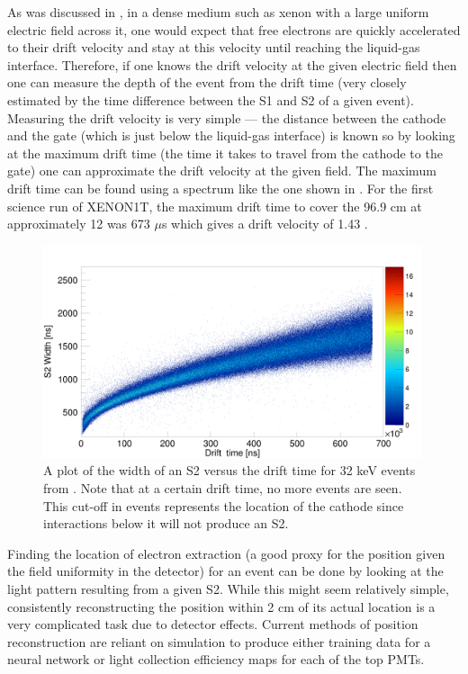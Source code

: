 As was discussed in , in a dense medium such as xenon with a large uniform electric field across it, one would expect that free electrons are quickly accelerated to their drift velocity and stay at this velocity until reaching the liquid-gas interface.  Therefore, if one knows the drift velocity at the given electric field then one can measure the depth of the event from the drift time (very closely estimated by the time difference between the S1 and S2 of a given event).  Measuring the drift velocity is very simple --- the distance between the cathode and the gate (which is just below the liquid-gas interface) is known so by looking at the maximum drift time (the time it takes to travel from the cathode to the gate) one can approximate the drift velocity at the given field.  The maximum drift time can be found using a spectrum like the one shown in .  For the first science run of XENON1T, the maximum drift time to cover the 96.9 cm at approximately 12  was 673 $\mu$s which gives a drift velocity of 1.43 .


\begin{figure}[t]
	\centering
	\includegraphics[width=0.99\textwidth]{xe1t_drift_time_vs_width}
	\caption{A plot of the width of an S2 versus the drift time for 32 keV events from .  Note that at a certain drift time, no more events are seen.  This cut-off in events represents the location of the cathode since interactions below it will not produce an S2.}
	\label{fig:xe1t_drift_time_vs_width}
\end{figure}


Finding the location of electron extraction (a good proxy for the position given the field uniformity in the detector) for an event can be done by looking at the light pattern resulting from a given S2.  While this might seem relatively simple, consistently reconstructing the position within 2 cm of its actual location is a very complicated task due to detector effects.  Current methods of position reconstruction are reliant on simulation to produce either training data for a neural network or light collection efficiency maps for each of the top PMTs.  

